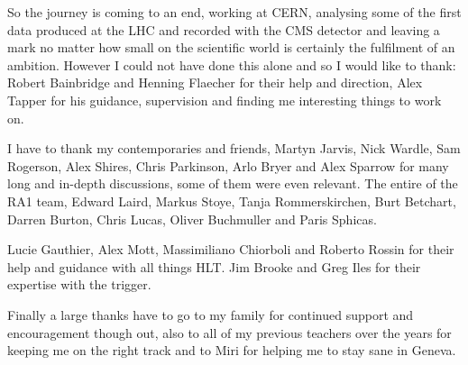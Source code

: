 \begin{acknowledgements}
So the journey is coming to an end, working at CERN, analysing some of the 
first data produced at the LHC and recorded with the CMS detector and leaving 
a mark no matter how small on the scientific world is certainly the fulfilment 
of an ambition. However I could not have done this alone and so I would like to 
thank: Robert Bainbridge and Henning Flaecher for their help and direction, 
Alex Tapper for his guidance, supervision and finding me interesting things to 
work on.

I have to thank my contemporaries and friends, Martyn Jarvis, Nick Wardle, Sam 
Rogerson, Alex Shires, Chris Parkinson, Arlo Bryer and Alex Sparrow for many 
long and in-depth discussions, some of them were even relevant. The entire of 
the RA1 team, Edward Laird, Markus Stoye, Tanja Rommerskirchen, Burt Betchart, 
Darren Burton, Chris Lucas, Oliver Buchmuller and Paris Sphicas.

Lucie Gauthier, Alex Mott, Massimiliano Chiorboli and Roberto Rossin for their 
help and guidance with all things HLT. Jim Brooke and Greg Iles for their 
expertise with the \Lone trigger.

Finally a large thanks have to go to my family for continued support and 
encouragement though out, also to all of my previous teachers over the years 
for keeping me on the right track and to Miri for helping me to stay sane in 
Geneva. 

\end{acknowledgements}

